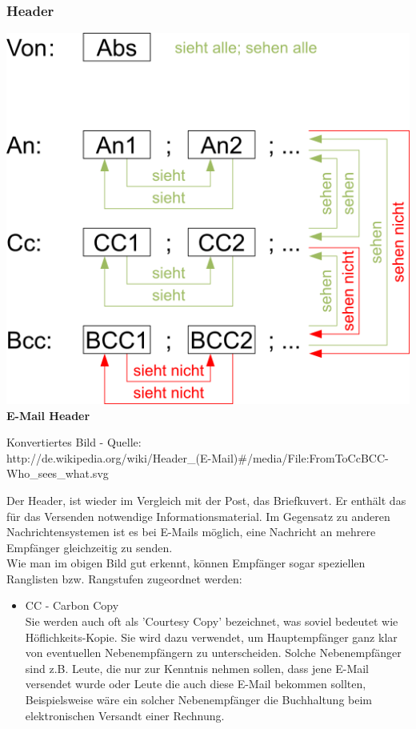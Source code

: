 \documentclass[12pt,a4paper]{report}
\begin{document}
\begin{onehalfspace}
\subsubsection{Header}
\begin{center}
\includegraphics[scale=0.9]{../docs/lyaton/graphics/E-Mail-Header.png}\\
\textbf{E-Mail Header}\\
\begin{scriptsize}
Konvertiertes Bild - Quelle:\\http://de.wikipedia.org/wiki/Header\_(E-Mail)\#/media/File:FromToCcBCC-Who\_sees\_what.svg
\end{scriptsize}
\end{center}
\vspace{0.5cm}
Der Header, ist wieder im Vergleich mit der Post, das Briefkuvert. Er enthält das für das Versenden notwendige Informationsmaterial. Im Gegensatz zu anderen Nachrichtensystemen ist es bei E-Mails möglich, eine Nachricht an mehrere Empfänger gleichzeitig zu senden.\\
Wie man im obigen Bild gut erkennt, können Empfänger sogar speziellen Ranglisten bzw. Rangstufen zugeordnet werden:
\begin{itemize}
\item CC - Carbon Copy\\
Sie werden auch oft als 'Courtesy Copy' bezeichnet, was soviel bedeutet wie Höflichkeits-Kopie. Sie wird dazu verwendet, um Hauptempfänger ganz klar von eventuellen Nebenempfängern zu unterscheiden. Solche Nebenempfänger sind z.B. Leute, die nur zur Kenntnis nehmen sollen, dass jene E-Mail versendet wurde oder Leute die auch diese E-Mail bekommen sollten, Beispielsweise wäre ein solcher Nebenempfänger die Buchhaltung beim elektronischen Versandt einer Rechnung.

\end{itemize}
\end{onehalfspace}
\end{document}

